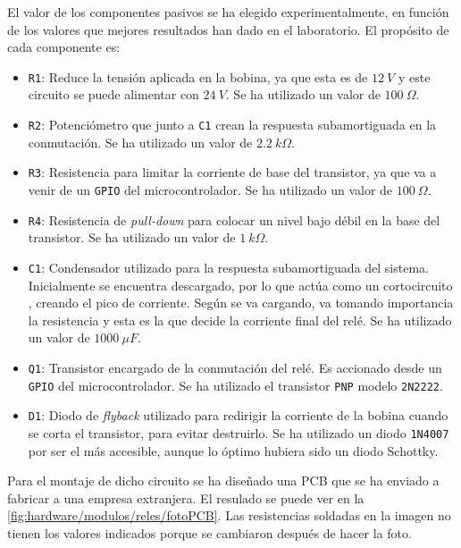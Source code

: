 El valor de los componentes pasivos se ha elegido experimentalmente, en función de los valores que mejores resultados han dado en el laboratorio. El propósito de cada componente es:
\begin{itemize}
    \item \texttt{R1}: Reduce la tensión aplicada en la bobina, ya que esta es de $12\ V$ y este circuito se puede alimentar con $24\ V$. Se ha utilizado un valor de $100\ \Omega$.
    \item \texttt{R2}: Potenciómetro que junto a \texttt{C1} crean la respuesta subamortiguada en la conmutación. Se ha utilizado un valor de $2.2\ k\Omega$.
    \item \texttt{R3}: Resistencia para limitar la corriente de base del transistor, ya que va a venir de un \texttt{GPIO} del microcontrolador. Se ha utilizado un valor de $100\ \Omega$.
    \item \texttt{R4}: Resistencia de \textit{pull-down} para colocar un nivel bajo débil en la base del transistor. Se ha utilizado un valor de $1\ k\Omega$.
    \item \texttt{C1}: Condensador utilizado para la respuesta subamortiguada del sistema. Inicialmente se encuentra descargado, por lo que actúa como un cortocircuito , creando el pico de corriente. Según se va cargando, va tomando importancia la resistencia y esta es la que decide la corriente final del relé. Se ha utilizado un valor de $1000\ \mu F$.
    \item \texttt{Q1}: Transistor encargado de la conmutación del relé. Es accionado desde un \texttt{GPIO} del microcontrolador. Se ha utilizado el transistor \texttt{PNP} modelo \texttt{2N2222}. 
    \item \texttt{D1}: Diodo de \textit{flyback} utilizado para redirigir la corriente de la bobina cuando se corta el transistor, para evitar destruirlo. Se ha utilizado un diodo \texttt{1N4007} por ser el más accesible, aunque lo óptimo hubiera sido un diodo Schottky.
\end{itemize}

Para el montaje de dicho circuito se ha diseñado una PCB que se ha enviado a fabricar a una empresa extranjera. El resulado se puede ver en la \autoref{fig:hardware/modulos/reles/fotoPCB}. Las resistencias soldadas en la imagen no tienen los valores indicados porque se cambiaron después de hacer la foto.

